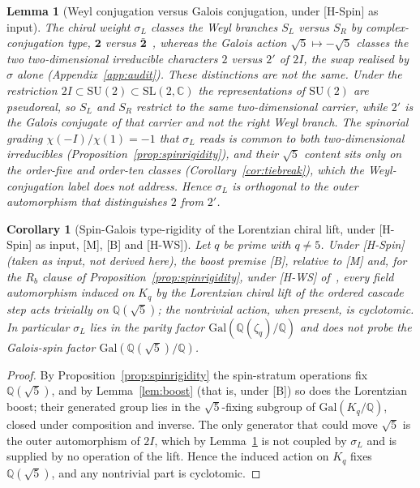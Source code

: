 \documentclass[11pt]{article}
\newtheorem{lemma}{Lemma}
\newtheorem{corollary}{Corollary}
\theoremstyle{definition}
\theoremstyle{remark}
\newcommand{\Gal}{\mathrm{Gal}}
\begin{document}
    \begin{lemma}[Weyl conjugation versus Galois conjugation, under {[H-Spin]} as input]
      \label{lem:weyl}
      The chiral weight $\sigma_L$ classes the Weyl branches $S_L$ versus $S_R$ by complex-conjugation type,
      $\mathbf{2}$ versus $\bar{\mathbf{2}}$~\cite{Beau2026cho}, whereas the Galois action $\sqrt{5}\mapsto-\sqrt{5}$
      classes the two two-dimensional irreducible characters $2$ versus $2'$ of $2I$, the swap realised by $\sigma$
      alone (Appendix~\ref{app:audit}).
      These distinctions are not the same.
      Under the restriction $2I\subset\mathrm{SU}(2)\subset\mathrm{SL}(2,\mathbb{C})$ the representations of
      $\mathrm{SU}(2)$ are pseudoreal, so $S_L$ and $S_R$ restrict to the same two-dimensional carrier, while $2'$ is
      the Galois conjugate of that carrier and not the right Weyl branch.
      The spinorial grading $\chi(-I)/\chi(1)=-1$ that $\sigma_L$ reads is common to both two-dimensional irreducibles
      (Proposition~\ref{prop:spinrigidity}), and their $\sqrt{5}$ content sits only on the order-five and order-ten
      classes (Corollary~\ref{cor:tiebreak}), which the Weyl-conjugation label does not address.
      Hence $\sigma_L$ is orthogonal to the outer automorphism that distinguishes $2$ from $2'$.
    \end{lemma}

    \begin{corollary}[Spin-Galois type-rigidity of the Lorentzian chiral lift, under {[H-Spin]} as input, {[M]}, {[B]} and {[H-WS]}]
      \label{cor:chiralrigidity}
      Let $q$ be prime with $q\neq5$.
      Under [H-Spin] (taken as input, not derived here), the boost premise [B], relative to [M] and, for the $R_b$ clause of
      Proposition~\ref{prop:spinrigidity}, under [H-WS] of~\cite{Beau2026q11of},
      every field automorphism induced on $K_q$ by the Lorentzian chiral lift of the ordered cascade step acts
      trivially on $\mathbb{Q}(\sqrt{5})$; the nontrivial action, when present, is cyclotomic.
      In particular $\sigma_L$ lies in the parity factor $\Gal(\mathbb{Q}(\zeta_q)/\mathbb{Q})$ and does not probe the
      Galois-spin factor $\Gal(\mathbb{Q}(\sqrt{5})/\mathbb{Q})$.
    \end{corollary}

    \begin{proof}
      By Proposition~\ref{prop:spinrigidity} the spin-stratum operations fix $\mathbb{Q}(\sqrt{5})$, and by
      Lemma~\ref{lem:boost} (that is, under [B]) so does the Lorentzian boost; their generated group lies in the $\sqrt{5}$-fixing subgroup
      of $\Gal(K_q/\mathbb{Q})$, closed under composition and inverse.
      The only generator that could move $\sqrt{5}$ is the outer automorphism of $2I$, which by Lemma~\ref{lem:weyl} is
      not coupled by $\sigma_L$ and is supplied by no operation of the lift.
      Hence the induced action on $K_q$ fixes $\mathbb{Q}(\sqrt{5})$, and any nontrivial part is cyclotomic.
    \end{proof}
\end{document}
